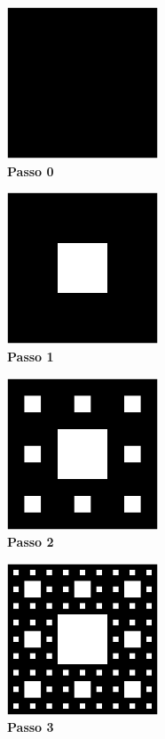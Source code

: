 \begin{minipage}{4.5cm}
	\begin{center}
		\includegraphics[width=4.5cm]{pics/carpet0.png}\\
		\textbf{Passo 0}
	\end{center}
\end{minipage}
\begin{minipage}{4.5cm}
	\begin{center}
		\includegraphics[width=4.5cm]{pics/carpet1.png}\\
		\textbf{Passo 1}
	\end{center}
\end{minipage}
\begin{minipage}{4.5cm}
	\begin{center}
		\includegraphics[width=4.5cm]{pics/carpet2.png}\\
		\textbf{Passo 2}
	\end{center}
\end{minipage}
\begin{minipage}{4.5cm}
	\begin{center}
		\includegraphics[width=4.5cm]{pics/carpet3.png}\\
		\textbf{Passo 3}
	\end{center}
\end{minipage}\\ 
\vspace*{0.5cm}\\

